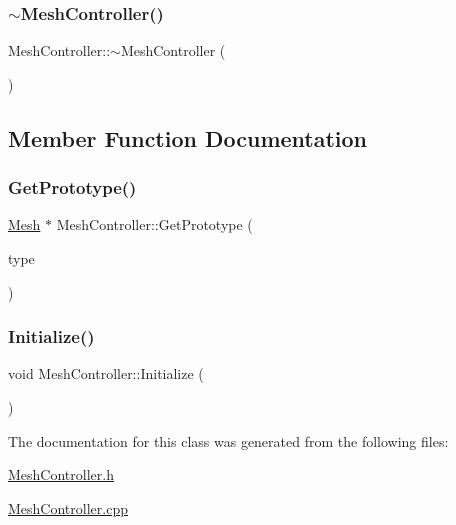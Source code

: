 \mbox{\label{class_mesh_controller_a674b1738fffaaed8f77970c8ab1c70f8}} 
\subsubsection{\texorpdfstring{$\sim$MeshController()}{~MeshController()}}
{\footnotesize\ttfamily Mesh\+Controller\+::$\sim$\+Mesh\+Controller (\begin{DoxyParamCaption}{ }\end{DoxyParamCaption})}



\subsection{Member Function Documentation}
\mbox{\label{class_mesh_controller_ad0bee88b35217e415e62a7183ca148a6}} 
\subsubsection{\texorpdfstring{GetPrototype()}{GetPrototype()}}
{\footnotesize\ttfamily \mbox{\hyperlink{class_mesh}{Mesh}} $\ast$ Mesh\+Controller\+::\+Get\+Prototype (\begin{DoxyParamCaption}\item[{\mbox{\hyperlink{_abstract_factory_2_abstract_factory_2builder_2_mesh_builder_8h_ad6436347ddb93aed826a19081b53dd61}{M\+E\+S\+H\+T\+Y\+PE}}}]{type }\end{DoxyParamCaption})}

\mbox{\label{class_mesh_controller_a7ea29b746017730e12c78dd8ca62e7e6}} 
\subsubsection{\texorpdfstring{Initialize()}{Initialize()}}
{\footnotesize\ttfamily void Mesh\+Controller\+::\+Initialize (\begin{DoxyParamCaption}{ }\end{DoxyParamCaption})}



The documentation for this class was generated from the following files\+:\begin{DoxyCompactItemize}
\item 
\mbox{\hyperlink{_mesh_controller_8h}{Mesh\+Controller.\+h}}\item 
\mbox{\hyperlink{_mesh_controller_8cpp}{Mesh\+Controller.\+cpp}}\end{DoxyCompactItemize}
